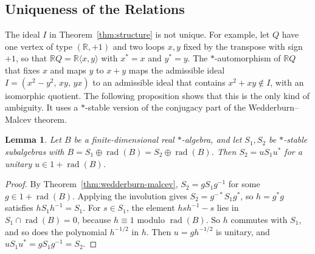 \documentclass[12pt, a4paper]{report}
\theoremstyle{plain}
\newtheorem{lemma}[theorem]{Lemma}
\theoremstyle{definition}
\theoremstyle{remark}
\theoremstyle{plain}
\newcommand{\rad}[0]{\operatorname{rad}} %
\newcommand{\RR}{\mathbb{R}}
\begin{document}
\subsection{Uniqueness of the Relations}
\label{subsec:relations-uniqueness}
The ideal $I$ in Theorem~\ref{thm:structure} is not unique. For example, let $Q$ have one vertex of type $(\RR,+1)$ and two loops $x,y$ fixed by the transpose with sign $+1$, so that $\RR Q=\RR\langle x,y\rangle$ with $x^*=x$ and $y^*=y$. The $*$-automorphism of $\RR Q$ that fixes $x$ and maps $y$ to $x+y$ maps the admissible ideal $I=(x^2-y^2,\,xy,\,yx)$ to an admissible ideal that contains $x^2+xy\notin I$, with an isomorphic quotient. The following proposition shows that this is the only kind of ambiguity. It uses a $*$-stable version of the conjugacy part of the Wedderburn--Malcev theorem.

\begin{lemma}\label{lem:star-conjugacy}
Let $B$ be a finite-dimensional real $*$-algebra, and let $S_1,S_2$ be $*$-stable subalgebras with $B=S_1\oplus\rad(B)=S_2\oplus\rad(B)$. Then $S_2=uS_1u^*$ for a unitary $u\in1+\rad(B)$.
\end{lemma}
\begin{proof}
By Theorem~\ref{thm:wedderburn-malcev}, $S_2=gS_1g^{-1}$ for some $g\in1+\rad(B)$. Applying the involution gives $S_2=g^{-*}S_1g^*$, so $h=g^*g$ satisfies $hS_1h^{-1}=S_1$. For $s\in S_1$, the element $hsh^{-1}-s$ lies in $S_1\cap\rad(B)=0$, because $h\equiv1$ modulo $\rad(B)$. So $h$ commutes with $S_1$, and so does the polynomial $h^{-1/2}$ in $h$. Then $u=gh^{-1/2}$ is unitary, and $uS_1u^*=gS_1g^{-1}=S_2$.
\end{proof}
\end{document}
